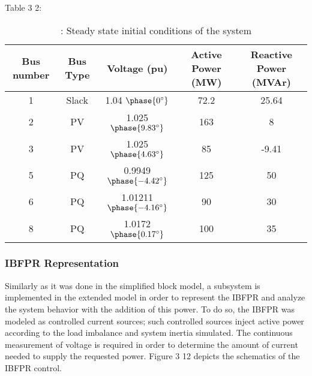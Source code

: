 Table 3 2: 
\begin{table}[h]
	\caption{\label{tb:initial}: Steady state initial conditions of the system}
	\centering
	\begin{tabular}{ccccc}
		\toprule
		\textbf{Bus number}	& \textbf{Bus Type}	& \textbf{Voltage (pu)}& \textbf{Active Power (MW)}& \textbf{Reactive Power (MVAr)}\\
		\midrule
		1		& Slack			& 1.04 $\phase{0^{\circ}} $     &    72.2    & 25.64    \\
		2		& PV			& 1.025 $\phase{9.83^{\circ}} $      & 163      & 8     \\
		3		& PV			& 1.025 $\phase{4.63^{\circ}} $     & 85       &    -9.41 \\
		5		& PQ			& 0.9949 $\phase{-4.42^{\circ}} $       &125       &  50    \\
		6		& PQ			& 1.01211 $\phase{-4.16^{\circ}} $      &   90     &  30   \\
		8		& PQ			& 1.0172 $ \phase{0.17^{\circ}} $       &  100     &   35   \\
		
		\bottomrule
	\end{tabular}
\end{table}


\subsubsection{IBFPR Representation}


Similarly as it was done in the simplified block model, a subsystem is implemented in the extended model in order to represent the IBFPR and analyze the system behavior with the addition of this power. To do so, the IBFPR was modeled as controlled current sources; such controlled sources inject active power according to the load imbalance and system inertia simulated. The continuous measurement of voltage is required in order to determine the amount of current needed to supply the requested power. Figure 3 12 depicts the schematics of the IBFPR control.

